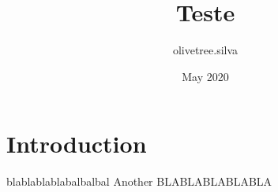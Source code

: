 \documentclass{article}
\title{Teste}
\author{olivetree.silva }
\date{May 2020}
\begin{document}
\maketitle

\section{Introduction}
blablablablabalbalbal
Another BLABLABLABLABLA
\end{document}
